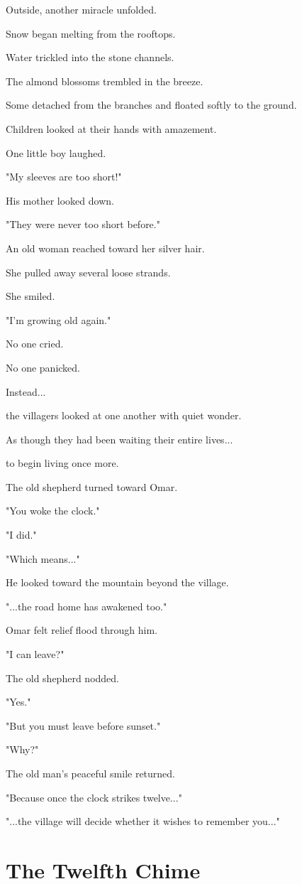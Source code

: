 \documentclass[12pt,openany]{book}
\begin{document}
Outside, another miracle unfolded.

Snow began melting from the rooftops.

Water trickled into the stone channels.

The almond blossoms trembled in the breeze.

Some detached from the branches and floated softly to the ground.

Children looked at their hands with amazement.

One little boy laughed.

"My sleeves are too short!"

His mother looked down.

"They were never too short before."

An old woman reached toward her silver hair.

She pulled away several loose strands.

She smiled.

"I'm growing old again."

No one cried.

No one panicked.

Instead...

the villagers looked at one another with quiet wonder.

As though they had been waiting their entire lives...

to begin living once more.

The old shepherd turned toward Omar.

"You woke the clock."

"I did."

"Which means..."

He looked toward the mountain beyond the village.

"...the road home has awakened too."

Omar felt relief flood through him.

"I can leave?"

The old shepherd nodded.

"Yes."

"But you must leave before sunset."

"Why?"

The old man's peaceful smile returned.

"Because once the clock strikes twelve..."

"...the village will decide whether it wishes to remember you..."
\section*{The Twelfth Chime}
\end{document}
